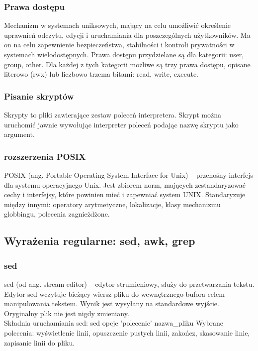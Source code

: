 \documentclass[a4paper,twoside]{report}
\begin{document}
\subsubsection{Prawa dostępu\\}

Mechanizm w systemach uniksowych, mający na celu umożliwić określenie uprawnień odczytu, edycji i uruchamiania dla poszczególnych użytkowników. Ma on na celu zapewnienie bezpieczeństwa, stabilności i kontroli prywatności w systemach wielodostępnych.
Prawa dostępu przydzielane są dla kategorii: user,    group,  other.
Dla każdej z tych kategorii możliwe są trzy prawa dostępu, opisane literowo (rwx) lub liczbowo trzema bitami: read, write, execute. 


\subsubsection{Pisanie skryptów}

Skrypty to pliki zawierające zestaw poleceń interpretera. Skrypt można uruchomić jawnie wywołując interpreter poleceń podając nazwę skryptu jako argument.


\subsubsection{rozszerzenia POSIX}


POSIX (ang. Portable Operating System Interface for Unix) – przenośny interfejs dla systemu operacyjnego Unix. Jest zbiorem norm, mających zestandaryzować cechy i interfejsy, które powinien mieć i zapewniać system UNIX. 
Standaryzuje między innymi: operatory arytmetyczne, lokalizacje, klasy mechanizmu globbingu, polecenia zagnieżdżone.








\subsection{Wyrażenia regularne: sed, awk, grep} 

\subsubsection{sed}

sed (od ang. stream editor) – edytor strumieniowy, służy do przetwarzania tekstu.
Edytor sed
wczytuje   bieżący   wiersz   pliku   do   wewnętrznego   bufora   celem
manipulowania   tekstem.   Wynik   jest   wysyłany   na   standardowe   wyjście.
Oryginalny plik nie jest nigdy zmieniany. 
\\
Składnia uruchamiania sed: sed 
opcje 'polecenie' nazwa\_pliku
Wybrane polecenia: wyświetlenie linii, opuszczenie pustych linii, zakończ, skasowanie linie, zapisanie linii do pliku.
\end{document}
